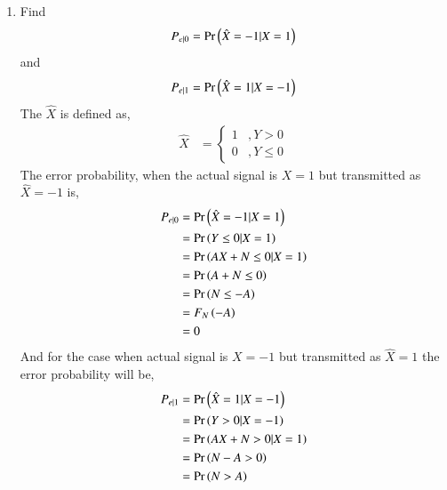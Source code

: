 \documentclass[journal,12pt,twocolumn]{IEEEtran}
\renewcommand\thesection{\arabic{section}}
\begin{document}
\begin{enumerate}[label=\thesection.\arabic*,ref=\thesection.\theenumi]
\begin{enumerate}[label=\thesection.\arabic*
,ref=\thesection.\theenumi]
	\solution When $ Y > 0 $, we can more probably say that $X = 1$ as $X$ can take values from $\sbrak{-1,1}$.As $A$ increases the signal contribution will increase compared to noise.The scatter plot will not be intermixed as $A$ increases. So in this case, the scatter plot of $Y$ is seperated with decision boundary as $0$. So we can more probably say that,
	  \begin{align}
		  X &= \begin{cases}
			  1 &, Y>0\\
			 -1 &, Y<0 
		       \end{cases}
          \end{align}		       
\item
\label{ml-ch4_sim}
Find
\begin{equation}
	P_{e|0} = \Pr\left(\hat{X} = -1|X=1\right)
\end{equation}
and
\begin{equation}
	P_{e|1} = \Pr\left(\hat{X} = 1|X=-1\right)
\end{equation}
%
\solution The $\hat{X}$ is defined as,
  \begin{align}
      \hat{X} &= \begin{cases}
	             1  &, Y > 0\\
		         0  &, Y\leq 0
		         \end{cases}
  \end{align}
 The error probability, when the actual signal is $X=1$ but transmitted as $\hat{X} = -1$ is,
  \begin{align}
	  P_{e|0} &= \Pr\left(\hat{X} = -1|X=1\right)\\
	          &= \Pr\left( Y \leq 0| X= 1\right)\\
		  &= \Pr\left(AX + N \leq 0 | X=1\right)\\
		  &= \Pr\left( A + N \leq 0\right)\\
		  &= \Pr\left(N \leq -A\right)\\
		  &= F_{N}\left(-A\right)\\
		  &= 0 \label{eq-5.5.1}
  \end{align}
 And for the case when actual signal is $X=-1$ but transmitted as $\hat{X} = 1$ the error probability will be,
  \begin{align}
	  P_{e|1} &= \pr{\hat{X} = 1|X=-1}\\
                  &= \pr{ Y > 0| X=-1}\\
                  &= \pr{AX + N > 0 | X=1}\\
                  &= \pr{ N-A > 0}\\
                  &= \pr{N > A}\\

\end{align}
\end{enumerate}
\end{enumerate}
\end{document}
